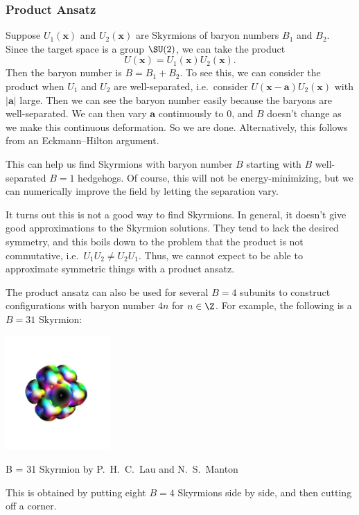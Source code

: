 \documentclass[a4paper]{article}
\begin{document}
\subsubsection*{Product Ansatz}
Suppose $U_1(\mathbf{x})$ and $U_2(\mathbf{x})$ are Skyrmions of baryon numbers $B_1$ and $B_2$. Since the target space is a group $\SU(2)$, we can take the product
\[
  U(\mathbf{x}) = U_1(\mathbf{x}) U_2(\mathbf{x}).
\]
Then the baryon number is $B = B_1 + B_2$. To see this, we can consider the product when $U_1$ and $U_2$ are well-separated, i.e.\ consider $U(\mathbf{x} - \mathbf{a}) U_2(\mathbf{x})$ with $|\mathbf{a}|$ large. Then we can see the baryon number easily because the baryons are well-separated. We can then vary $\mathbf{a}$ continuously to $0$, and $B$ doesn't change as we make this continuous deformation. So we are done. Alternatively, this follows from an Eckmann--Hilton argument.

This can help us find Skyrmions with baryon number $B$ starting with $B$ well-separated $B = 1$ hedgehogs. Of course, this will not be energy-minimizing, but we can numerically improve the field by letting the separation vary.

It turns out this is not a good way to find Skyrmions. In general, it doesn't give good approximations to the Skyrmion solutions. They tend to lack the desired symmetry, and this boils down to the problem that the product is not commutative, i.e.\ $U_1 U_2 \not= U_2 U_1$. Thus, we cannot expect to be able to approximate symmetric things with a product ansatz.

The product ansatz can also be used for several $B = 4$ subunits to construct configurations with baryon number $4n$ for $n \in \Z$. For example, the following is a $B = 31$ Skyrmion:
\begin{center}
  \includegraphics[clip, width=0.3\textwidth, trim=4cm 4cm 4cm 4cm]{images/B-31-Skyrmion.pdf}

  B = 31 Skyrmion by P.\ H.\ C.\ Lau and N.\ S.\ Manton
\end{center}
This is obtained by putting eight $B = 4$ Skyrmions side by side, and then cutting off a corner.
\end{document}
